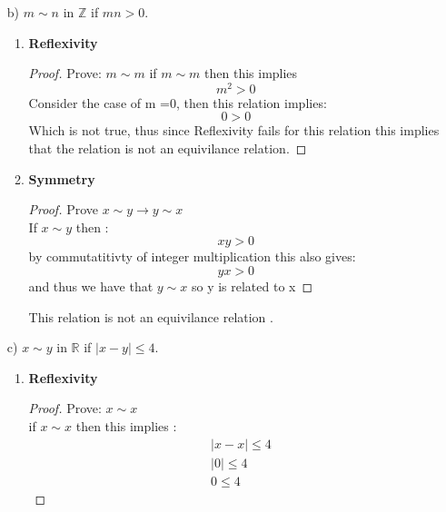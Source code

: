 \documentclass[11pt]{article}
\theoremstyle{definition}  %
\newcommand{\Z}{\mathbb{Z}}
\newcommand{\R}{\mathbb{R}}
\begin{document}
\begin{enumerate}
\begin{itemize}
\begin{enumerate}
\begin{proof}
      \end{proof}\\
      \item \textbf{Transitivity}
      \begin{proof}
          Prove if $x\sim y$ and $y\sim z$ then $x \sim z $\\
          if $x \sim y$ then $x\geq y$, if $y \sim z$ then $ y\geq z $ then:
          \[
            x \geq y \geq z
          \]
          \[
            x\geq z
          \]
          Therefore $x\sim z$
      \end{proof}
      This relation is not an equivilance relation .
    \end{enumerate}
    \item[b)] $m \sim n$ in $\Z$ if $mn > 0$.
    \begin{enumerate}
      \item \textbf{Reflexivity}
      \begin{proof}
        Prove: $m\sim m$
        if $m\sim m $ then this implies \[
          m^2>0
        \]
        Consider the case of m =0, then this relation implies:
        \[
          0>0
        \]
        Which is not true, thus since Reflexivity fails for this relation this implies that the relation is not an equivilance relation.
      \end{proof}
      \item \textbf{Symmetry}
      \begin{proof}
        Prove $x \sim y \rightarrow y \sim x $\\
        If $x\sim y$ then :
        \[
          xy>0
        \]
        by commutatitivty of  integer multiplication this also gives:
    \[
      yx>0
    \]
    and thus we have that $y\sim x$ so y is related to x
      \end{proof}
      This relation is not an equivilance relation .
    \end{enumerate}
    \item[c)] $x \sim y$ in $\R$ if $|x-y| \leq 4$.
    \begin{enumerate}
      \item \textbf{Reflexivity}
      \begin{proof}
        Prove: $x\sim x$\\
        if $x \sim x $ then this implies :
        \begin{align*}
        &|x-x|\leq 4\\
        &|0|\leq 4\\
        &0\leq 4
        \end{align*}

\end{proof}
\end{enumerate}
\end{itemize}
\end{enumerate}
\end{document}
